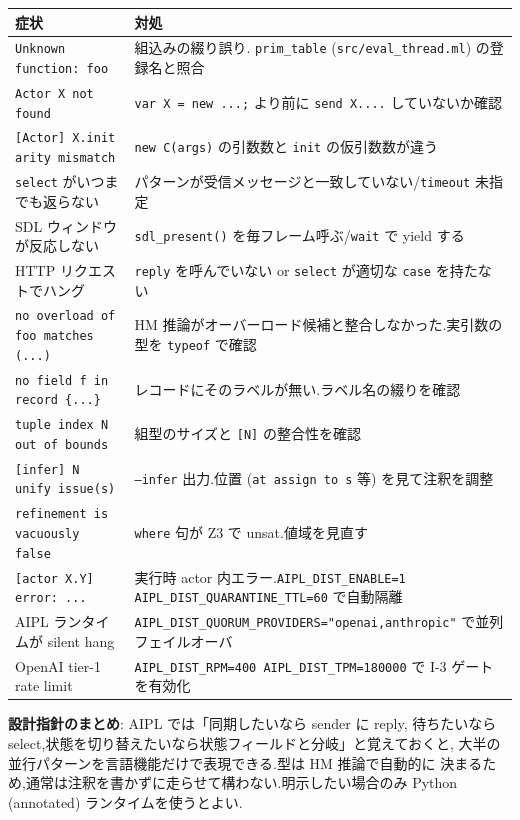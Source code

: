 \documentclass[11pt,a4paper]{article}
\begin{document}
\begin{center}
\begin{tabular}{p{6cm}p{8cm}}
\toprule
症状 & 対処 \\
\midrule
\texttt{Unknown function: foo} & 組込みの綴り誤り. \texttt{prim\_table} (\texttt{src/eval\_thread.ml}) の登録名と照合 \\
\texttt{Actor X not found} & \texttt{var X = new ...;} より前に \texttt{send X....} していないか確認 \\
\texttt{[Actor] X.init arity mismatch} & \texttt{new C(args)} の引数数と \texttt{init} の仮引数数が違う \\
\texttt{select} がいつまでも返らない & パターンが受信メッセージと一致していない/\texttt{timeout} 未指定 \\
SDL ウィンドウが反応しない & \texttt{sdl\_present()} を毎フレーム呼ぶ/\texttt{wait} で yield する \\
HTTP リクエストでハング & \texttt{reply} を呼んでいない or \texttt{select} が適切な \texttt{case} を持たない \\
\texttt{no overload of foo matches (...)} & HM 推論がオーバーロード候補と整合しなかった.実引数の型を \texttt{typeof} で確認 \\
\texttt{no field f in record \{...\}} & レコードにそのラベルが無い.ラベル名の綴りを確認 \\
\texttt{tuple index N out of bounds} & 組型のサイズと \texttt{[N]} の整合性を確認 \\
\texttt{[infer] N unify issue(s)} & \texttt{--infer} 出力.位置 (\texttt{at assign to s} 等) を見て注釈を調整 \\
\texttt{refinement is vacuously false} & \texttt{where} 句が Z3 で unsat.値域を見直す \\
\texttt{[actor X.Y] error: ...} & 実行時 actor 内エラー.\texttt{AIPL\_DIST\_ENABLE=1 AIPL\_DIST\_QUARANTINE\_TTL=60} で自動隔離 \\
AIPL ランタイムが silent hang & \texttt{AIPL\_DIST\_QUORUM\_PROVIDERS="openai,anthropic"} で並列フェイルオーバ \\
OpenAI tier-1 rate limit & \texttt{AIPL\_DIST\_RPM=400 AIPL\_DIST\_TPM=180000} で I-3 ゲートを有効化 \\
\bottomrule
\end{tabular}
\end{center}

\par\vspace{8pt}
\noindent\textbf{設計指針のまとめ}: AIPL では「同期したいなら sender に reply,
待ちたいなら select,状態を切り替えたいなら状態フィールドと分岐」と覚えておくと,
大半の並行パターンを言語機能だけで表現できる.型は HM 推論で自動的に
決まるため,通常は注釈を書かずに走らせて構わない.明示したい場合のみ
Python (annotated) ランタイムを使うとよい.
\end{document}
